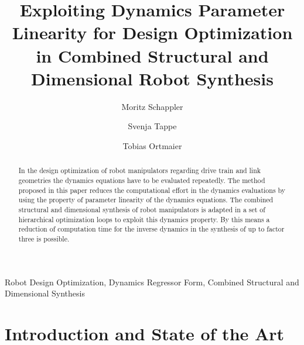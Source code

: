 \documentclass{svproc}
\begin{document}
    
\mainmatter              %
%
\title{Exploiting Dynamics Parameter Linearity for Design Optimization in Combined Structural and Dimensional Robot Synthesis}
%
%
\author{Moritz Schappler \and Svenja Tappe \and Tobias Ortmaier}
%
%
%

\maketitle              %


\begin{abstract}
In the design optimization of robot manipulators regarding drive train and link geometries the dynamics equations have to be evaluated repeatedly.
The method proposed in this paper reduces the computational effort in the dynamics evaluations by using the property of parameter linearity of the dynamics equations.
The combined structural and dimensional synthesis of robot manipulators is adapted in a set of hierarchical optimization loops to exploit this dynamics property.
By this means a reduction of computation time for the inverse dynamics in the synthesis of up to factor three is possible.
\end{abstract}

\begin{keywords}
Robot Design Optimization, Dynamics Regressor Form, Combined Structural and Dimensional Synthesis
\end{keywords}

\section{Introduction and State of the Art}
\label{sec:Intro}

\end{document}
